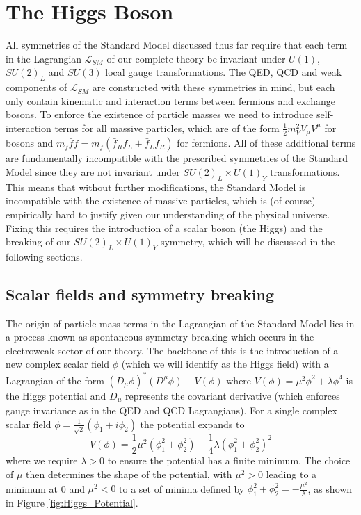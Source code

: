 \section{The Higgs Boson}

All symmetries of the Standard Model discussed thus far require that each term in the Lagrangian 
$\mathcal{L}_{SM}$ of our complete theory be invariant under $U(1)$, $SU(2)_L$ and $SU(3)$ local gauge 
transformations. The QED, QCD and weak components of $\mathcal{L}_{SM}$ are constructed with these symmetries 
in mind, but each only contain kinematic and interaction terms between fermions and exchange bosons. To enforce 
the existence of particle masses we need to introduce self-interaction terms for all massive particles, which are of the 
form $\frac{1}{2}m_V^2V_{\mu}V^{\mu}$ for bosons and $m_f\bar{f}f = m_f(\bar{f}_Rf_L + \bar{f}_Lf_R)$ for 
fermions. All of these additional terms are fundamentally incompatible with the prescribed symmetries of the Standard 
Model since they are not invariant under $SU(2)_L \times U(1)_Y$ transformations. This means that without further 
modifications, the Standard Model is incompatible with the existence of massive particles, which is (of course) 
empirically hard to justify given our understanding of the physical universe. Fixing this requires the introduction of a 
scalar boson (the Higgs) and the breaking of our $SU(2)_L \times U(1)_Y$ symmetry, which will be discussed in the 
following sections.

\subsection{Scalar fields and symmetry breaking}

The origin of particle mass terms in the Lagrangian of the Standard Model lies in a process known as spontaneous 
symmetry breaking which occurs in the electroweak sector of our theory. The backbone of this is the introduction of 
a new complex scalar field $\phi$ (which we will identify as the Higgs field) with a Lagrangian of the form 
$(D_{\mu}\phi)^*(D^{\mu}\phi) - V(\phi)$ where $V(\phi) = \mu^2\phi^2 + \lambda\phi^4$ is the Higgs potential 
and $D_{\mu}$ represents the covariant derivative (which enforces gauge invariance as in the QED and QCD 
Lagrangians). For a single complex scalar field $\phi = \frac{1}{\sqrt{2}}(\phi_1 + i\phi_2)$ the potential expands to
\begin{equation}
V(\phi) = \frac{1}{2}\mu^2(\phi_1^2 + \phi_2^2) - \frac{1}{4}\lambda(\phi_1^2 + \phi_2^2)^2
\end{equation}
where we require $\lambda > 0$ to ensure the potential has a finite minimum. The choice of $\mu$ then determines 
the shape of the potential, with $\mu^2 > 0$ leading to a minimum at 0 and $\mu^2 < 0$ to a set of minima defined 
by $\phi_1^2 + \phi_2^2 = -\frac{\mu^2}{\lambda}$, as shown in Figure \ref{fig:Higgs_Potential}. 

